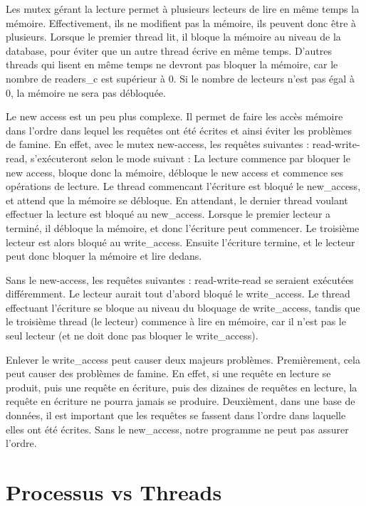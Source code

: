 \documentclass[utf8]{article}
\begin{document}
\begin{large}
\par
Les mutex gérant la lecture permet à plusieurs lecteurs de lire en même temps la
mémoire. Effectivement, ils ne modifient pas la mémoire, ils peuvent donc être à
plusieurs. Lorsque le premier thread lit, il bloque la mémoire au niveau de la
database, pour éviter que un autre thread écrive en même temps. D'autres threads
qui lisent en même temps ne devront pas bloquer la mémoire, car le nombre de
readers\_c est supérieur à 0. Si le nombre de lecteurs n'est pas égal à 0,
la mémoire ne sera pas débloquée.
\par
Le new access est un peu plus complexe. Il permet de faire les accès mémoire
dans l'ordre dans lequel les requêtes ont été écrites et ainsi éviter les problèmes de
famine. En effet, avec le mutex new-access, les requêtes suivantes :
read-write-read, s'exécuteront selon le mode suivant : La lecture commence par
bloquer le new access, bloque donc la mémoire, débloque le new access et
commence ses opérations de lecture. Le thread commencant l'écriture est bloqué le
new\_access, et attend que la mémoire se débloque. En attendant, le dernier
thread voulant effectuer la lecture est bloqué au new\_access. Lorsque le
premier lecteur a terminé, il débloque la mémoire, et donc l'écriture peut
commencer. Le troisième lecteur est alors bloqué au write\_access. Ensuite
l'écriture termine, et le lecteur peut donc bloquer la mémoire et lire dedans.
\par
Sans le new-access, les requêtes suivantes : read-write-read se seraient
exécutées différemment. Le lecteur aurait tout d'abord bloqué le write\_access.
Le thread effectuant l'écriture se bloque au niveau du bloquage de
write\_access, tandis que le troisième thread (le lecteur) commence à lire en
mémoire, car il n'est pas le seul lecteur (et ne doit donc pas bloquer le
write\_access).
\par
Enlever le write\_access peut causer deux majeurs problèmes. Premièrement, cela
peut causer des problèmes de famine. En effet, si une requête en lecture se
produit, puis une requête en écriture, puis des dizaines de requêtes en lecture,
la requête en écriture ne pourra jamais se produire. Deuxièment, dans une base
de données, il est important que les requêtes se fassent dans l'ordre dans
laquelle elles ont été écrites. Sans le new\_access, notre programme ne peut pas
assurer l'ordre.
\par
\section{Processus vs Threads}
\par
\indent


\end{large}
\end{document}
